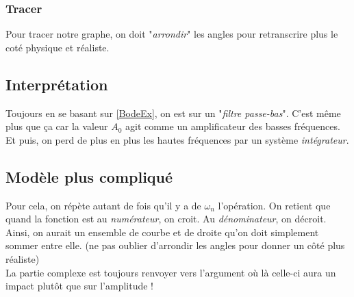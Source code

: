 \documentclass{report}
\begin{document}
\subsubsection{Tracer}
Pour tracer notre graphe, on doit "\textit{arrondir}" les angles pour retranscrire plus le coté physique et réaliste.

\subsection{Interprétation}
Toujours en se basant sur \ref{BodeEx}, on est sur un "\textit{filtre passe-bas}". C'est même plus que ça car la valeur $A_0$ agit comme un amplificateur des basses fréquences. Et puis, on perd de plus en plus les hautes fréquences par un système \textit{intégrateur}.

\subsection{Modèle plus compliqué}
Pour cela, on répète autant de fois qu'il y a de $\omega_n$ l'opération. On retient que quand la fonction est au \textit{numérateur}, on croit. Au \textit{dénominateur}, on décroit.\\
Ainsi, on aurait un ensemble de courbe et de droite qu'on doit simplement sommer entre elle. (ne pas oublier d'arrondir les angles pour donner un côté plus réaliste)\\
La partie complexe est toujours renvoyer vers l'argument où là celle-ci aura un impact plutôt que sur l'amplitude !
\end{document}
